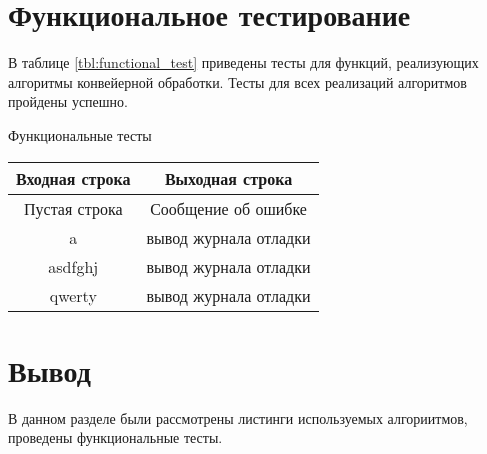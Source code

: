 \newpage
\section{Функциональное тестирование}

В таблице \ref{tbl:functional_test} приведены тесты для функций, реализующих алгоритмы конвейерной обработки. Тесты для всех реализаций алгоритмов пройдены успешно.
	\begin{center}

				\begin{threeparttable}
					\captionsetup{justification=raggedright,singlelinecheck=off}
					\caption{\label{tbl:functional_test} Функциональные тесты}
					\begin{tabular}{|c|c|}
						\hline
						Входная строка & Выходная строка \\
						\hline
						Пустая строка & Сообщение об ошибке\\
						\hline
						a & вывод журнала отладки\\
						\hline
						asdfghj & вывод журнала отладки\\
						\hline
						qwerty & вывод журнала отладки\\
						\hline
					\end{tabular}
				\end{threeparttable}
	\end{center}



\section*{Вывод}
В данном разделе были рассмотрены листинги используемых алгориитмов, проведены функциональные тесты.
